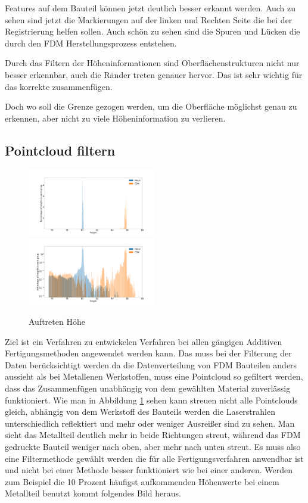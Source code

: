 \documentclass[../main.tex]{subfiles}
\begin{document}
Features auf dem Bauteil können jetzt deutlich besser erkannt werden. Auch zu sehen
sind jetzt die Markierungen auf der linken und Rechten Seite die bei der Registrierung
helfen sollen. Auch schön zu sehen sind die Spuren und Lücken die durch den FDM 
Herstellungsprozess entstehen.

Durch das Filtern der Höheninformationen sind Oberflächenstrukturen nicht nur besser
erkennbar, auch die Ränder treten genauer hervor. Das ist sehr wichtig für das korrekte
zusammenfügen.

Doch wo soll die Grenze gezogen werden, um die Oberfläche möglichst genau zu erkennen,
aber nicht zu viele Höheninformation zu verlieren.

\subsection{Pointcloud filtern}

\begin{figure}
    \centering
    \includegraphics[width=0.5\textwidth]{images/height_occurange.png}
    \includegraphics[width=0.5\textwidth]{images/height_occurange_log.png}
    \caption{Auftreten Höhe}
    \label{fig:brightness}
\end{figure}

Ziel ist ein Verfahren zu entwickelen Verfahren bei allen gängigen 
Additiven Fertigungsmethoden angewendet werden kann.
Das muss bei der Filterung der Daten berücksichtigt werden
da die Datenverteilung von FDM Bauteilen anders aussieht als bei Metallenen Werkstoffen, 
muss eine Pointcloud so gefiltert werden, dass das Zusammenfügen unabhängig von dem 
gewählten Material zuverlässig funktioniert.
Wie man in Abbildung \ref{fig:brightness} sehen kann streuen nicht alle Pointclouds 
gleich, abhängig von dem Werkstoff des Bauteils werden die Laserstrahlen unterschiedlich
reflektiert und mehr oder weniger Ausreißer sind zu sehen. 
Man sieht das Metallteil deutlich mehr in beide Richtungen 
streut, während das FDM gedruckte Bauteil weniger nach oben, aber mehr nach unten 
streut. Es muss also eine Filtermethode gewählt werden die für alle Fertigungsverfahren
anwendbar ist und nicht bei einer Methode besser funktioniert wie bei einer 
anderen. Werden zum Beispiel die 10 Prozent häufigst aufkommenden Höhenwerte bei einem
Metallteil benutzt kommt folgendes Bild heraus.
\end{document}
